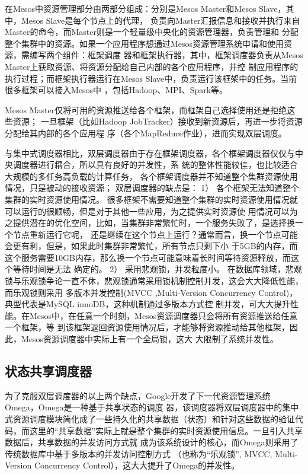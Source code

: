 在Mesos中资源管理部分由两部分组成：分别是Mesos Master和Mesos Slave，其中，Mesos Slave是每个节点上的代理，
负责向Master汇报信息和接收并执行来自Master的命令，而Master则是一个轻量级中央化的资源管理器，负责管理和
分配整个集群中的资源。如果一个应用程序想通过Mesos资源管理系统申请和使用资源，需编写两个组件：框架调度
器和框架执行器，其中，框架调度器负责从Mesos Master上获取资源、将资源分配给自己内部的各个应用程序，并控
制应用程序的执行过程；而框架执行器运行在Mesos Slave中，负责运行该框架中的任务。当前很多框架可以接入Mesos中
，包括Hadoop、MPI、Spark等。

Mesos Master仅将可用的资源推送给各个框架，而框架自己选择使用还是拒绝这些资源；
一旦框架（比如Hadoop JobTracker）接收到新资源后，再进一步将资源分配给其内部的各个应用程
序（各个MapReduce作业），进而实现双层调度。

与集中式调度器相比，双层调度器由于存在框架调度器，各个框架调度器仅仅与中央调度器进行耦合，所以具有良好的并发性，系
统的整体性能较佳，也比较适合大规模的多任务高负载的计算任务，
各个框架调度器并不知道整个集群资源使用情况，只是被动的接收资源；
双层调度器的缺点是：
1）  各个框架无法知道整个集群的实时资源使用情况。
很多框架不需要知道整个集群的实时资源使用情况就可以运行的很顺畅，但是对于其他一些应用，为之提供实时资源使
用情况可以为之提供潜在的优化空间，比如，当集群非常繁忙时，一个服务失败了，是选择换一个节点重新运行它呢，
还是继续在这个节点上运行？通常而言，换一个节点可能会更有利，但是，如果此时集群非常繁忙，所有节点只剩下小
于5GB的内存，而这个服务需要10GB内存，那么换一个节点可能意味着长时间等待资源释放，而这个等待时间是无法
确定的。
2）  采用悲观锁，并发粒度小。
在数据库领域，悲观锁与乐观锁争论一直不休，悲观锁通常采用锁机制控制并发，这会大大降低性能，而乐观锁则采用
多版本并发控制(MVCC ,Multi-Version Concurrency Control)，典型代表是MySQL innoDB，这种机制通过多版本方式控
制并发，可大大提升性能。在Mesos中，在任意一个时刻，Mesos资源调度器只会将所有资源推送给任意一个框架，等
到该框架返回资源使用情况后，才能够将资源推动给其他框架，因此，Mesos资源调度器中实际上有一个全局锁，这大
大限制了系统并发性。
\subsection{状态共享调度器}
为了克服双层调度器的以上两个缺点，Google开发了下一代资源管理系统Omega，Omega是一种基于共享状态的调度
器，该调度器将双层调度器中的集中式资源调度模块简化成了一些持久化的共享数据（状态）和针对这些数据的验证代
码，而这里的“共享数据”实际上就是整个集群的实时资源使用信息。一旦引入共享数据后，共享数据的并发访问方式就
成为该系统设计的核心，而Omega则采用了传统数据库中基于多版本的并发访问控制方式
（也称为“乐观锁”, MVCC, Multi-Version Concurrency Control），这大大提升了Omega的并发性。

